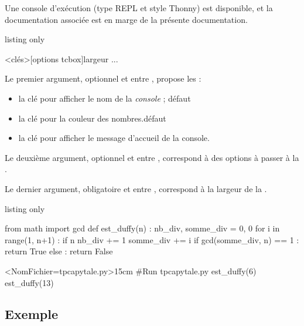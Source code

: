 \begin{noteblock}
 Une console d'exécution (type REPL et style \textsf{Thonny}) est disponible, et la documentation associée est en marge de la présente documentation.
\end{noteblock}

\begin{PresCodeTexPL}{listing only}
\begin{PitonThonnyConsole}<clés>[options tcbox]{largeur}
...
\end{PitonThonnyConsole}
\end{PresCodeTexPL}

\begin{cautionblock}
Le premier argument, optionnel et entre , propose les  :

\begin{itemize}
	\item la clé   pour afficher le nom de la \textit{console} ; \hfill{}défaut 
	\item {} la clé  pour la couleur des nombres.\hfill{}défaut 
	\item la clé  pour afficher le message d'accueil de la console.
\end{itemize}

Le deuxième argument, optionnel et entre \ctex{[...]}, correspond à des options à passer à la .

Le dernier argument, obligatoire et entre , correspond à la largeur de la .
\end{cautionblock}

\begin{PresCodeTexPL}{listing only}
\begin{python}
from math import gcd
def est_duffy(n) :
	nb_div, somme_div = 0, 0
	for i in range(1, n+1) :
		if n %
			nb_div += 1
			somme_div += i
	if gcd(somme_div, n) == 1 :
		return True
	else :
		return False

\end{python}

\begin{PitonThonnyConsole}<NomFichier=tpcapytale.py>{15cm}
#Run tpcapytale.py
est_duffy(6)
est_duffy(13)
\end{PitonThonnyConsole}
\end{PresCodeTexPL}

\subsection{Exemple}

